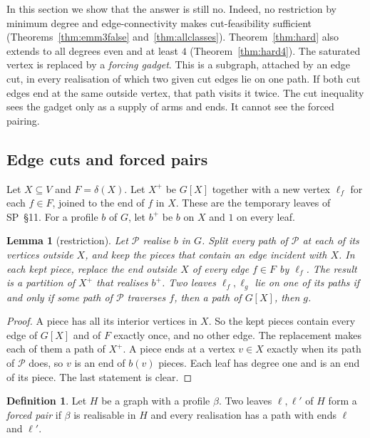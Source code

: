 \documentclass[11pt]{amsart}
\newtheorem{lemma}[theorem]{Lemma}
\theoremstyle{definition}
\newtheorem{definition}[theorem]{Definition}
\newcommand{\cP}{\mathcal P}
\begin{document}
In this section we show that the answer is still no. Indeed, no restriction by minimum degree and
edge-connectivity makes cut-feasibility sufficient (Theorems~\ref{thm:emm3false}
and~\ref{thm:allclasses}). Theorem~\ref{thm:hard} also extends to all degrees even and at least $4$
(Theorem~\ref{thm:hard4}). The saturated vertex is replaced by a \emph{forcing gadget}. This is a
subgraph, attached by an edge cut, in every realisation of which two given cut edges lie on one path.
If both cut edges end at the same outside vertex, that path visits it twice. The cut inequality sees
the gadget only as a supply of arms and ends. It cannot see the forced pairing.

\subsection{Edge cuts and forced pairs}
Let $X\subseteq V$ and $F=\delta(X)$. Let $X^+$ be $G[X]$ together with a new vertex $\ell_f$ for each
$f\in F$, joined to the end of $f$ in $X$. These are the temporary leaves of SP~\S11. For a profile $b$
of $G$, let $b^+$ be $b$ on $X$ and $1$ on every leaf.

\begin{lemma}[restriction]\label{lem:restrict}
Let $\cP$ realise $b$ in $G$. Split every path of $\cP$ at each of its vertices outside $X$, and keep
the pieces that contain an edge incident with $X$. In each kept piece, replace the end outside $X$
of every edge $f\in F$ by $\ell_f$. The result is a partition of $X^+$ that realises $b^+$. Two leaves
$\ell_f,\ell_g$ lie on one of its paths if and only if some path of $\cP$ traverses $f$, then a path
of $G[X]$, then $g$.
\end{lemma}

\begin{proof}
A piece has all its interior vertices in $X$. So the kept pieces contain every edge of $G[X]$ and of
$F$ exactly once, and no other edge. The replacement makes each of them a path of $X^+$. A piece ends
at a vertex $v\in X$ exactly when its path of $\cP$ does, so $v$ is an end of $b(v)$ pieces. Each
leaf has degree one and is an end of its piece. The last statement is clear.
\end{proof}

\begin{definition}
Let $H$ be a graph with a profile $\beta$. Two leaves $\ell,\ell'$ of $H$ form a \emph{forced pair} if
$\beta$ is realisable in $H$ and every realisation has a path with ends $\ell$ and $\ell'$.
\end{definition}
\end{document}
